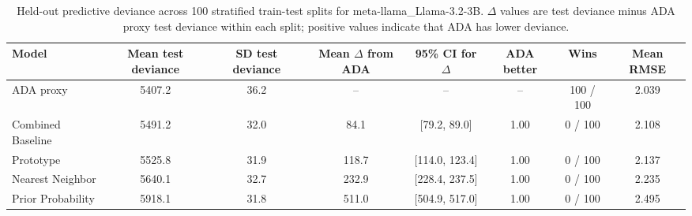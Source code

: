 \begin{table}

\caption{\label{tab:repeated-split-deviance-meta-llama-llama-3-2-3b}Held-out predictive deviance across 100 stratified train-test splits for meta-llama_Llama-3.2-3B. $\Delta$ values are test deviance minus ADA proxy test deviance within each split; positive values indicate that ADA has lower deviance.}
\centering
\begin{tabular}[t]{lccccccc}
\toprule
Model & Mean test deviance & SD test deviance & Mean $\Delta$ from ADA & 95\% CI for $\Delta$ & ADA better & Wins & Mean RMSE\\
\midrule
ADA proxy & 5407.2 & 36.2 & -- & -- & -- & 100 / 100 & 2.039\\
Combined Baseline & 5491.2 & 32.0 & 84.1 & {}[79.2, 89.0] & 1.00 & 0 / 100 & 2.108\\
Prototype & 5525.8 & 31.9 & 118.7 & {}[114.0, 123.4] & 1.00 & 0 / 100 & 2.137\\
Nearest Neighbor & 5640.1 & 32.7 & 232.9 & {}[228.4, 237.5] & 1.00 & 0 / 100 & 2.235\\
Prior Probability & 5918.1 & 31.8 & 511.0 & {}[504.9, 517.0] & 1.00 & 0 / 100 & 2.495\\
\bottomrule
\end{tabular}
\end{table}
